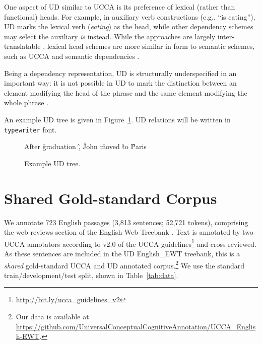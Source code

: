 \documentclass[11pt,a4paper,table]{article}
\begin{document}
  One aspect of UD similar to UCCA is its preference of lexical (rather than functional) heads.
  For example, in auxiliary verb constructions (e.g., ``is eating''), UD
  marks the lexical verb (\textit{eating}) as the head, while other dependency schemes
  may select the auxiliary \textit{is} instead.
  While the approaches are largely inter-translatable
  \citep{Schwartz:12}, lexical head schemes are more similar in form to semantic schemes,
   such as UCCA and semantic dependencies \citep{oepen2016towards}.
   
Being a dependency representation, UD is structurally underspecified in an important way:
​it is not possible in UD to mark the distinction between an element modifying the head of
the phrase and the same element modifying the whole phrase
\cite{doi:10.1146/annurev-linguistics-011718-011842}.
   
An example UD tree is given in Figure~\ref{fig:original_example_ud}.
UD relations will be written in \texttt{typewriter} font.

\begin{figure}[th]
  \centering
    \begin{dependency}[text only label, label style={above,font=\tt}, font=\small]
    \begin{deptext}[column sep=.8em,ampersand replacement=\^]
    After \^ graduation \^ , \^ John \^ moved \^ to \^ Paris \\
    \end{deptext}
    \end{dependency}
\caption{Example UD tree.\label{fig:original_example_ud}}
\end{figure}

\section{Shared Gold-standard Corpus}\label{sec:shared}

We annotate 723 English passages (3,813 sentences; 52,721 tokens),
comprising the web reviews section of the 
English Web Treebank \cite[EWT; ][]{bies2012english}.
Text is annotated by two UCCA annotators
according to v2.0 of the UCCA
guidelines\footnote{\url{http://bit.ly/ucca_guidelines_v2}}
and cross-reviewed.
As these sentences are included in the UD
English\_EWT treebank, this is a \textit{shared} gold-standard UCCA and UD
annotated corpus.\footnote{Our data is available at \url{https://github.com/UniversalConceptualCognitiveAnnotation/UCCA_English-EWT}.}
We use the standard train/development/test split,
shown in Table~\ref{tab:data}.
\end{document}
